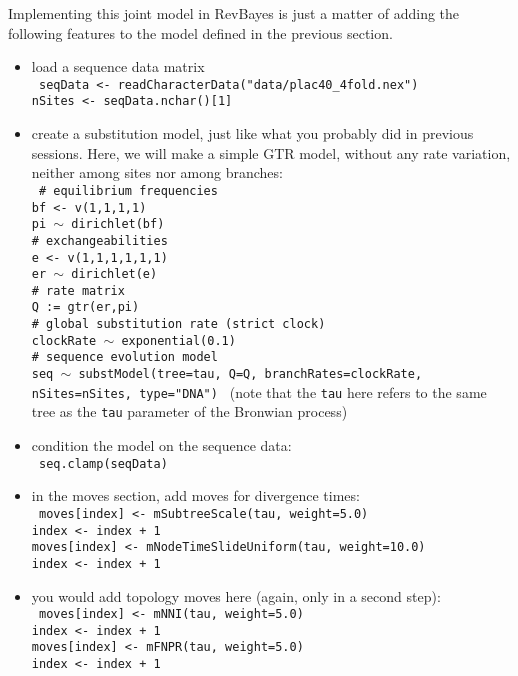 \documentclass[usletter]{article}
\newcommand{\cmd}[1]{\texttt{#1}}
\begin{document}
Implementing this joint model in RevBayes is just a matter of
adding the following features to the model defined in the previous section.
\begin{itemize}
\item
load a sequence data matrix
\\
\cmd{
seqData <- readCharacterData("data/plac40\_4fold.nex")
\\
nSites <- seqData.nchar()[1]
}
\item
create a substitution model, just like what you probably did in previous sessions. Here, we will make a simple GTR model, without any rate variation, neither among sites nor among branches:
\\
\cmd{
\# equilibrium frequencies
\\
bf <- v(1,1,1,1)
\\
pi $\sim$ dirichlet(bf)
\\
\# exchangeabilities
\\
e <- v(1,1,1,1,1,1)
\\
er $\sim$ dirichlet(e)
\\
\# rate matrix
\\
Q := gtr(er,pi)
\\
\# global substitution rate (strict clock)
\\
clockRate $\sim$ exponential(0.1)
\\
\# sequence evolution model
\\
seq $\sim$ substModel(tree=tau, Q=Q, branchRates=clockRate, nSites=nSites, type="DNA")
}
(note that the \cmd{tau} here refers to the same tree as the \cmd{tau} parameter of the Bronwian process)
\item
condition the model on the sequence data:
\\
\cmd{
seq.clamp(seqData)
}
\item
in the moves section, add moves for divergence times:
\\
\cmd{
moves[index] <- mSubtreeScale(tau, weight=5.0)
\\
index <- index + 1
\\
moves[index] <- mNodeTimeSlideUniform(tau, weight=10.0)
\\
index <- index + 1
}
\item
you would add topology moves here (again, only in a second step):
\\
\cmd{
moves[index] <- mNNI(tau, weight=5.0)
\\
index <- index + 1
\\
moves[index] <- mFNPR(tau, weight=5.0)
\\
index <- index + 1
}
\end{itemize}
\end{document}
